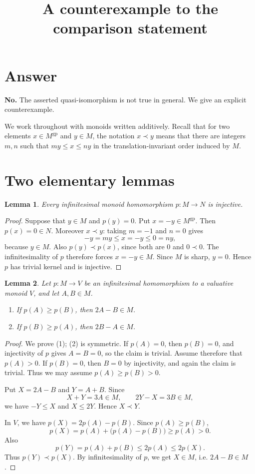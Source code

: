 \documentclass{article}
\title{A counterexample to the comparison statement}
\author{}
\date{}
\newtheorem{lemma}{Lemma}
\theoremstyle{definition}
\newcommand{\gp}{^{\mathrm{gp}}}
\begin{document}
\maketitle

\section{Answer}

\noindent
\textbf{No.}  The asserted quasi-isomorphism is not true in general.  We give an explicit counterexample.

We work throughout with monoids written additively.  Recall that for two elements
$x\in M\gp$ and $y\in M$, the notation $x\prec y$ means that there are integers
$m,n$ such that $m y\le x\le n y$ in the translation-invariant order induced by $M$.

\section{Two elementary lemmas}

\begin{lemma}
\label{lem:inf-injective}
Every infinitesimal monoid homomorphism $p:M\to N$ is injective.
\end{lemma}

\begin{proof}
Suppose that $y\in M$ and $p(y)=0$.  Put $x=-y\in M\gp$.  Then $p(x)=0\in N$.
Moreover $x\prec y$: taking $m=-1$ and $n=0$ gives
\[
-y=my\le x=-y\le 0=ny,
\]
because $y\in M$.  Also $p(y)\prec p(x)$, since both are $0$ and $0\prec 0$.
The infinitesimality of $p$ therefore forces $x=-y\in M$.  Since $M$ is sharp,
$y=0$.  Hence $p$ has trivial kernel and is injective.
\end{proof}

\begin{lemma}
\label{lem:key}
Let $p:M\to V$ be an infinitesimal homomorphism to a valuative monoid $V$,
and let $A,B\in M$.
\begin{enumerate}
\item If $p(A)\ge p(B)$, then $2A-B\in M$.
\item If $p(B)\ge p(A)$, then $2B-A\in M$.
\end{enumerate}
\end{lemma}

\begin{proof}
We prove (1); (2) is symmetric.  If $p(A)=0$, then $p(B)=0$, and injectivity
of $p$ gives $A=B=0$, so the claim is trivial.  Assume therefore that
$p(A)>0$.  If $p(B)=0$, then $B=0$ by injectivity, and again the claim is
trivial.  Thus we may assume $p(A)\ge p(B)>0$.

Put $X=2A-B$ and $Y=A+B$.  Since
\[
X+Y=3A\in M,\qquad 2Y-X=3B\in M,
\]
we have $-Y\le X$ and $X\le 2Y$.  Hence $X\prec Y$.

In $V$, we have $p(X)=2p(A)-p(B)$.  Since $p(A)\ge p(B)$,
\[
p(X)=p(A)+\bigl(p(A)-p(B)\bigr)\ge p(A)>0.
\]
Also
\[
p(Y)=p(A)+p(B)\le 2p(A)\le 2p(X).
\]
Thus $p(Y)\prec p(X)$.  By infinitesimality of $p$, we get $X\in M$, i.e.
$2A-B\in M$.
\end{proof}
\end{document}
